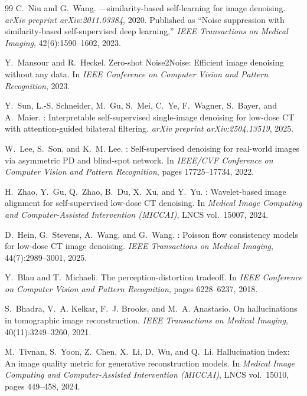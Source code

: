 \documentclass[letterpaper]{article} %
\begin{document}
\begin{thebibliography}{99}
C.~Niu and G.~Wang.
---similarity-based self-learning for image denoising.
\newblock \emph{arXiv preprint arXiv:2011.03384}, 2020.
\newblock Published as ``Noise suppression with similarity-based
  self-supervised deep learning,'' \emph{IEEE Transactions on Medical Imaging},
  42(6):1590--1602, 2023.

Y.~Mansour and R.~Heckel.
\newblock Zero-shot {Noise2Noise}: Efficient image denoising without any data.
\newblock In \emph{IEEE Conference on Computer Vision and Pattern Recognition},
  2023.

Y.~Sun, L.-S. Schneider, M.~Gu, S.~Mei, C.~Ye, F.~Wagner, S.~Bayer, and
  A.~Maier.
: Interpretable self-supervised single-image denoising
  for low-dose {CT} with attention-guided bilateral filtering.
\newblock \emph{arXiv preprint arXiv:2504.13519}, 2025.

W.~Lee, S.~Son, and K.~M. Lee.
: Self-supervised denoising for real-world images via
  asymmetric {PD} and blind-spot network.
\newblock In \emph{IEEE/CVF Conference on Computer Vision and Pattern
  Recognition}, pages 17725--17734, 2022.

H.~Zhao, Y.~Gu, Q.~Zhao, B.~Du, X.~Xu, and Y.~Yu.
: Wavelet-based image alignment for self-supervised
  low-dose {CT} denoising.
\newblock In \emph{Medical Image Computing and Computer-Assisted Intervention
  (MICCAI)}, LNCS vol.\ 15007, 2024.

D.~Hein, G.~Stevens, A.~Wang, and G.~Wang.
: Poisson flow consistency models for low-dose {CT} image
  denoising.
\newblock \emph{IEEE Transactions on Medical Imaging}, 44(7):2989--3001, 2025.

Y.~Blau and T.~Michaeli.
\newblock The perception-distortion tradeoff.
\newblock In \emph{IEEE Conference on Computer Vision and Pattern Recognition},
  pages 6228--6237, 2018.

S.~Bhadra, V.~A. Kelkar, F.~J. Brooks, and M.~A. Anastasio.
\newblock On hallucinations in tomographic image reconstruction.
\newblock \emph{IEEE Transactions on Medical Imaging}, 40(11):3249--3260, 2021.

M.~Tivnan, S.~Yoon, Z.~Chen, X.~Li, D.~Wu, and Q.~Li.
\newblock Hallucination index: An image quality metric for generative
  reconstruction models.
\newblock In \emph{Medical Image Computing and Computer-Assisted Intervention
  (MICCAI)}, LNCS vol.\ 15010, pages 449--458, 2024.


\end{thebibliography}
\end{document}
